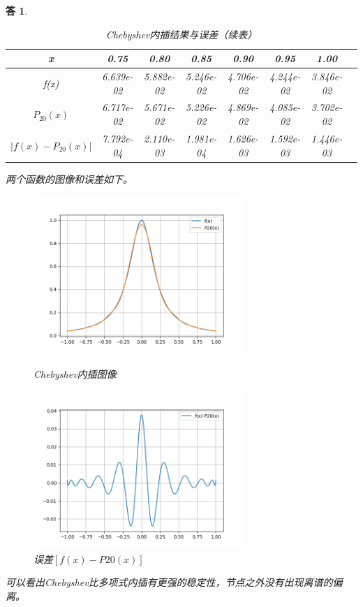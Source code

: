 \documentclass[10pt]{ctexart}
\newtheorem*{answer}{答}
\begin{document}
\begin{answer}
\begin{table}
        \centering
        \begin{tabular}{cccccccc}
            \toprule
            x & 0.75 & 0.80 & 0.85 & 0.90 & 0.95 & 1.00\\
            \midrule
            f(x) &  6.639e-02 & 5.882e-02  & 5.246e-02&  4.706e-02  &  4.244e-02 &3.846e-02&\\
            $P_{20}(x)$ &  6.717e-02 & 5.671e-02 & 5.226e-02&4.869e-02 & 4.085e-02 & 3.702e-02 &\\
            $\lvert f(x)-P_{20}(x)\rvert$ & 7.792e-04& 2.110e-03& 1.981e-04 & 1.626e-03& 1.592e-03 & 1.446e-03&\\
            \bottomrule
        \end{tabular}
        \caption{Chebyshev内插结果与误差（续表）}
    \end{table}
    两个函数的图像和误差如下。
    \begin{figure}[H]
        \centering
        \begin{minipage}{0.45\linewidth}
            \centering
            \includegraphics[width=8cm]{Chebyshev.png}
            \caption{Chebyshev内插图像}
        \end{minipage}
        \qquad
        \begin{minipage}{0.45\linewidth}
            \centering
            \includegraphics[width=8cm]{errChebyshev.png}
            \caption{误差$\left [f(x)-P20(x)\right ]$}
        \end{minipage}
    \end{figure}
    可以看出Chebyshev比多项式内插有更强的稳定性，节点之外没有出现离谱的偏离。
\end{answer}
\end{document}
